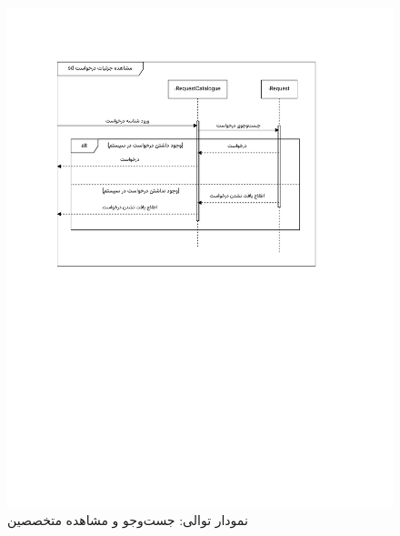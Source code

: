 \begin{figure}[ht!]
	\centering
	\includegraphics[scale=0.8, page=7]{figs/OOD-Sequence-2.pdf}
	\caption{نمودار توالی: جست‌وجو و مشاهده متخصصین}
\end{figure}
\FloatBarrier
\newpage


